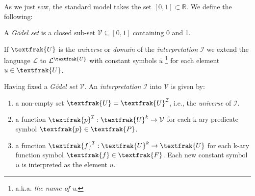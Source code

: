		 As we just saw, the standard model takes the set $[0,1] \subset \mathbb{R}$. We define the following:
		 \begin{definition}
		 	A \emph{Gödel set} is a closed sub-set $\mathcal{V} \subseteq [0,1]$ containing 0 and 1.
		 \end{definition}
		 
		 If $\textfrak{U}$ is the \emph{universe} or \emph{domain} of the \emph{interpretation} $\mathcal{I}$ we extend the language $\mathcal{L}$ to $\mathcal{L}^\textfrak{U}$ with constant symbols $\bar{u}$ \footnote{a.k.a. \emph{the name of u}.} for each element $u \in \textfrak{U}$. 
		 
		 \begin{definition}
		 	Having fixed a \emph{Gödel set} $\mathcal{V}$. \newline
		 	An \emph{interpretation} $\mathcal{I}$ into $\mathcal{V}$ is given by:
		 	\begin{enumerate}
		 		\item a non-empty set $\textfrak{U} = \textfrak{U}^\mathcal{I}$, i.e., the \emph{universe} of $\mathcal{I}$.
		 		\item a function $\textfrak{p}^\mathcal{I} : \textfrak{U}^k \rightarrow \mathcal{V}$ for each k-ary predicate symbol $\textfrak{p} \in \textfrak{P}$.
		 		\item a function $\textfrak{f}^\mathcal{I} : \textfrak{U}^k \rightarrow \textfrak{U}$ for each k-ary function symbol $\textfrak{f} \in \textfrak{F}$. Each new constant symbol $\bar{u}$ is interpreted as the element $u$.
		 	\end{enumerate}
		 \end{definition}
		 
